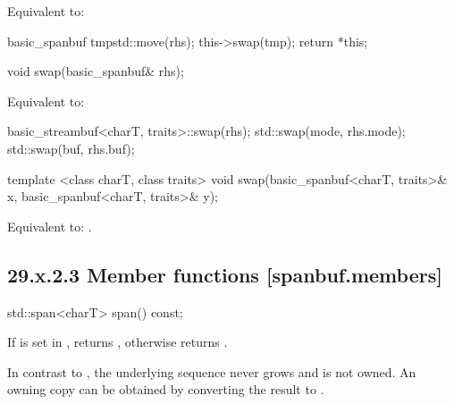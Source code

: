 \documentclass[ebook,11pt,article]{memoir}
\begin{document}
\begin{itemdescr}
\pnum
\effects Equivalent to:
\begin{codeblock}
    basic_spanbuf tmp{std::move(rhs)};
    this->swap(tmp);
    return *this;
\end{codeblock}
\end{itemdescr}

\begin{itemdecl}
void swap(basic_spanbuf& rhs);
\end{itemdecl}

\begin{itemdescr}
\pnum
\effects Equivalent to:
\begin{codeblock} 
    basic_streambuf<charT, traits>::swap(rhs);
    std::swap(mode, rhs.mode);
    std::swap(buf, rhs.buf);
\end{codeblock}
\end{itemdescr}

\begin{itemdecl}
template <class charT, class traits>
  void swap(basic_spanbuf<charT, traits>& x,
            basic_spanbuf<charT, traits>& y);
\end{itemdecl}

\begin{itemdescr}
\pnum
\effects Equivalent to: .
\end{itemdescr}


\subsection{29.x.2.3 Member functions [spanbuf.members]}

\begin{itemdecl}
std::span<charT> span() const;
\end{itemdecl}

\begin{itemdescr}
\pnum
\returns
If  is set in ,
returns , 
otherwise returns . 

\begin{note}
In contrast to , the underlying sequence never grows and is not owned. 
An owning copy can be obtained by converting the result to .
\end{note}


\end{itemdescr}
\end{document}
